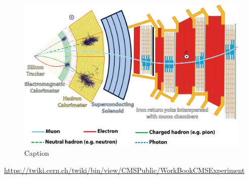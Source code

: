 \begin{figure}[h!]
    \centering
    \includegraphics[width=0.5\linewidth]{CMSslice_whiteBackground (1).png}
    \caption{Caption}
    \label{fig:CMS_capas}
\end{figure}



\url{https://twiki.cern.ch/twiki/bin/view/CMSPublic/WorkBookCMSExperiment}
